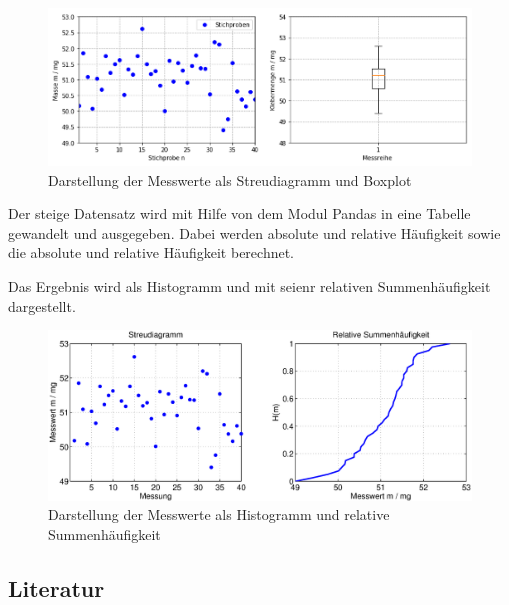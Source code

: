 \noindent 
\begin{figure}[H]
  \centerline{\includegraphics[width=1\textwidth]{Kapitel3/Bilder/image17}}
  \caption{Darstellung der Messwerte als Streudiagramm und Boxplot}
  \label{fig:Inconnue}
\end{figure}



\noindent Der steige Datensatz wird mit Hilfe von dem Modul Pandas in eine Tabelle gewandelt und ausgegeben. Dabei werden absolute und relative H\"{a}ufigkeit sowie die absolute und relative H\"{a}ufigkeit berechnet.

\clearpage



\noindent Das Ergebnis wird als Histogramm und mit seienr relativen Summenh\"{a}ufigkeit dargestellt.

\noindent 
\begin{figure}[H]
  \centerline{\includegraphics[width=1\textwidth]{Kapitel3/Bilder/image18}}
  \caption{Darstellung der Messwerte als Histogramm und relative Summenh\"{a}ufigkeit}
  \label{fig:AnwendungsbeispielKlebermenge1}
\end{figure}



\clearpage


\subsection{Literatur}

